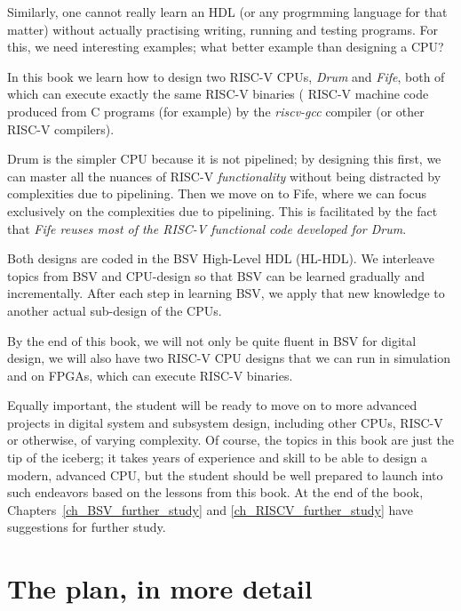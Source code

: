Similarly, one cannot really learn an HDL (or any progrmming language
for that matter) without actually practising writing, running and
testing programs.  For this, we need interesting examples; what better
example than designing a CPU?

In this book we learn how to design two RISC-V CPUs, \emph{Drum} and
\emph{Fife}, both of which can execute exactly the same RISC-V
binaries ({\ie} RISC-V machine code produced from C programs (for
example) by the \emph{riscv-gcc} compiler (or other RISC-V compilers).

Drum is the simpler CPU because it is not pipelined; by designing this
first, we can master all the nuances of RISC-V \emph{functionality}
without being distracted by complexities due to pipelining.  Then we
move on to Fife, where we can focus exclusively on the complexities
due to pipelining.  This is facilitated by the fact that \emph{Fife
reuses most of the RISC-V functional code developed for Drum}.

Both designs are coded in the BSV High-Level HDL (HL-HDL).  We
interleave topics from BSV and CPU-design so that BSV can be learned
gradually and incrementally.  After each step in learning BSV, we
apply that new knowledge to another actual sub-design of the CPUs.

By the end of this book, we will not only be quite fluent in BSV for
digital design, we will also have two RISC-V CPU designs that we can
run in simulation and on FPGAs, {\ie} which can execute RISC-V
binaries.

Equally important, the student will be ready to move on to more
advanced projects in digital system and subsystem design, including
other CPUs, RISC-V or otherwise, of varying complexity.  Of course,
the topics in this book are just the tip of the iceberg; it takes
years of experience and skill to be able to design a modern, advanced
CPU, but the student should be well prepared to launch into such
endeavors based on the lessons from this book.  At the end of the
book, Chapters~\ref{ch_BSV_further_study} and
\ref{ch_RISCV_further_study} have suggestions for further study.


\section{The plan, in more detail}

